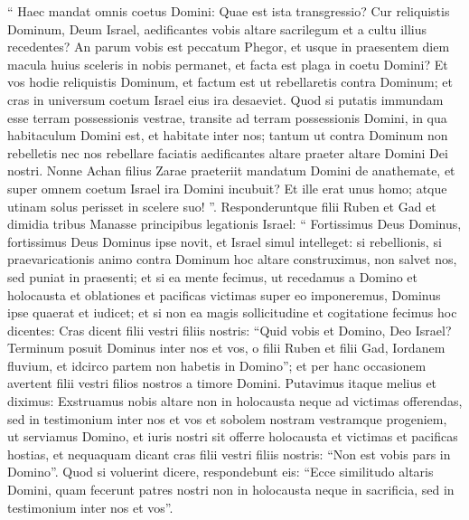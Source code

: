 \begin{biblechapter}
\begin{biblechapter}
\begin{biblechapter}
\begin{biblechapter}
\begin{biblechapter}
\begin{biblechapter}
\begin{biblechapter}
\begin{biblechapter}
\begin{biblechapter}
\begin{biblechapter}
\begin{biblechapter}
\begin{biblechapter}
\begin{biblechapter}
\begin{biblechapter}
\begin{biblechapter}
\begin{biblechapter}
\begin{biblechapter}
\begin{biblechapter}
\begin{biblechapter}
\begin{biblechapter}
\begin{biblechapter}
\begin{biblechapter}
\verse “ Haec mandat omnis coetus Domini: Quae est ista transgressio? Cur reliquistis Dominum, Deum Israel, aedificantes vobis altare sacrilegum et a cultu illius recedentes? 
\verse An parum vobis est peccatum Phegor, et usque in praesentem diem macula huius sceleris in nobis permanet, et facta est plaga in coetu Domini? 
\verse Et vos hodie reliquistis Dominum, et factum est ut rebellaretis contra Dominum; et cras in universum coetum Israel eius ira desaeviet. 
\verse Quod si putatis immundam esse terram possessionis vestrae, transite ad terram possessionis Domini, in qua habitaculum Domini est, et habitate inter nos; tantum ut contra Dominum non rebelletis nec nos rebellare faciatis aedificantes altare praeter altare Domini Dei nostri. 
\verse Nonne Achan filius Zarae praeteriit mandatum Domini de anathemate, et super omnem coetum Israel ira Domini incubuit? Et ille erat unus homo; atque utinam solus perisset in scelere suo! ”.
 \verse Responderuntque filii Ruben et Gad et dimidia tribus Manasse principibus legationis Israel: 
\verse “ Fortissimus Deus Dominus, fortissimus Deus Dominus ipse novit, et Israel simul intelleget: si rebellionis, si praevaricationis animo contra Dominum hoc altare construximus, non salvet nos, sed puniat in praesenti; 
\verse et si ea mente fecimus, ut recedamus a Domino et holocausta et oblationes et pacificas victimas super eo imponeremus, Dominus ipse quaerat et iudicet; 
\verse et si non ea magis sollicitudine et cogitatione fecimus hoc dicentes: Cras dicent filii vestri filiis nostris: “Quid vobis et Domino, Deo Israel? 
\verse Terminum posuit Dominus inter nos et vos, o filii Ruben et filii Gad, Iordanem fluvium, et idcirco partem non habetis in Domino”; et per hanc occasionem avertent filii vestri filios nostros a timore Domini. Putavimus itaque melius 
\verse et diximus: Exstruamus nobis altare non in holocausta neque ad victimas offerendas, 
\verse sed in testimonium inter nos et vos et sobolem nostram vestramque progeniem, ut serviamus Domino, et iuris nostri sit offerre holocausta et victimas et pacificas hostias, et nequaquam dicant cras filii vestri filiis nostris: “Non est vobis pars in Domino”. 
\verse Quod si voluerint dicere, respondebunt eis: “Ecce similitudo altaris Domini, quam fecerunt patres nostri non in holocausta neque in sacrificia, sed in testimonium inter nos et vos”. 

\end{biblechapter}
\end{biblechapter}
\end{biblechapter}
\end{biblechapter}
\end{biblechapter}
\end{biblechapter}
\end{biblechapter}
\end{biblechapter}
\end{biblechapter}
\end{biblechapter}
\end{biblechapter}
\end{biblechapter}
\end{biblechapter}
\end{biblechapter}
\end{biblechapter}
\end{biblechapter}
\end{biblechapter}
\end{biblechapter}
\end{biblechapter}
\end{biblechapter}
\end{biblechapter}
\end{biblechapter}
